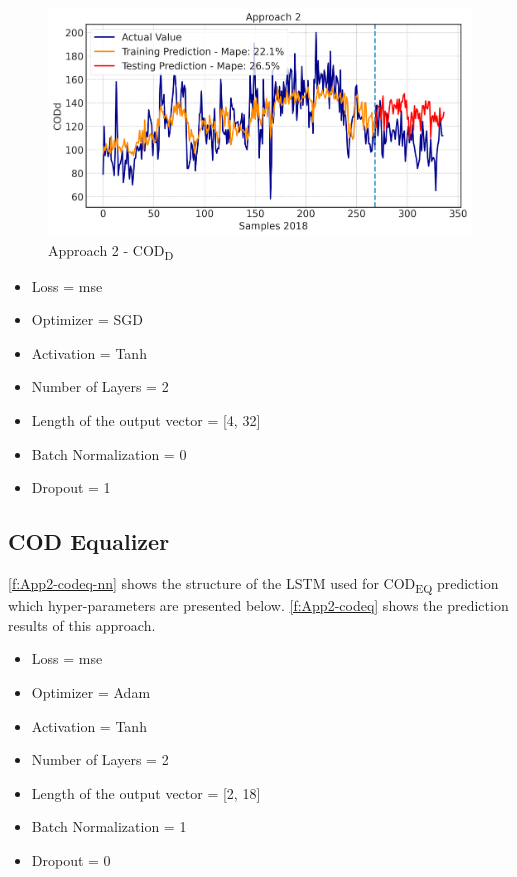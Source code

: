 \begin{figure}[h!]
\centering
\includegraphics[width=\linewidth]{figures/Ch5/CODd-2.pdf}
\caption{Approach 2 - COD\textsubscript{D}}
\label{f:App2-codd}
\end{figure}

\begin{itemize}
    \item Loss = mse
    \item Optimizer = SGD
    \item Activation =  Tanh
    \item Number of Layers = 2
    \item Length of the output vector = [4, 32]
    \item Batch Normalization = 0
    \item Dropout = 1
\end{itemize}

\subsection{COD Equalizer}
\autoref{f:App2-codeq-nn} shows the structure of the \ac{LSTM} used for \ac{COD}\textsubscript{EQ} prediction which hyper-parameters are presented below. \autoref{f:App2-codeq} shows the prediction results of this approach.

\begin{itemize}
    \item Loss = mse
    \item Optimizer = Adam
    \item Activation =  Tanh
    \item Number of Layers = 2
    \item Length of the output vector = [2, 18]
    \item Batch Normalization = 1
    \item Dropout = 0
\end{itemize}


